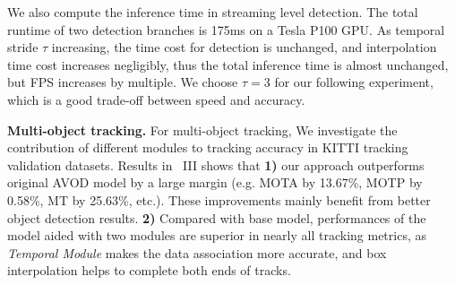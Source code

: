 \documentclass[letterpaper, 10pt, conference]{ieeeconf}  %
\begin{document}
We also compute the inference time in streaming level detection. The total runtime of two detection branches is 175ms on a Tesla P100 GPU. As temporal stride $\tau$ increasing, the time cost for detection is unchanged, and interpolation time cost increases negligibly, thus the total inference time is almost unchanged, but FPS increases by multiple. We choose $\tau = 3$ for our following experiment, which is a good trade-off between speed and accuracy.

\textbf{Multi-object tracking.} For multi-object tracking, We investigate the contribution of different modules to tracking accuracy in KITTI tracking validation datasets. Results in \tablename \, III shows that \textbf{1)} our approach outperforms original AVOD model by a large margin (e.g. MOTA by 13.67\%, MOTP by 0.58\%, MT by 25.63\%, etc.). These improvements mainly benefit from better object detection results. \textbf{2)} Compared with base model, performances of the model aided with two modules are superior in nearly all tracking metrics, as \textit{Temporal Module} makes the data association more accurate, and box interpolation helps to complete both ends of tracks. 
\end{document}

